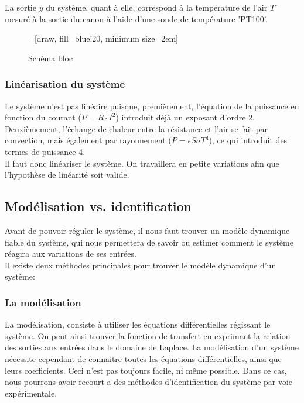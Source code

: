 La sortie $y$ du système, quant à elle, correspond à la température de l'air $T^\circ$
mesuré à la sortie du canon à l'aide d'une sonde de température 'PT100'.\\ 

\begin{figure}[H]	
    \centering
    =[draw, fill=blue!20, minimum size=2em]
    \caption{Schéma bloc}
\end{figure}


\subsubsection{Linéarisation du système}
Le système n'est pas linéaire puisque, premièrement, l'équation de la puissance en fonction
du courant ($P = R \cdot I^2$) introduit déjà un exposant d'ordre 2. 
Deuxièmement, l'échange de chaleur entre la résistance et l'air se fait par convection, 
mais également par rayonnement ($P = \epsilon S \sigma T^4$), ce qui introduit des termes
de puissance 4.\\

Il faut donc linéariser le système. On travaillera en petite variations afin que
l'hypothèse de linéarité soit valide.
 


\subsection{Modélisation vs. identification}
Avant de pouvoir réguler le système, il nous faut trouver un modèle dynamique fiable
du système, qui nous permettera de savoir ou estimer comment le système réagira aux
variations de ses entrées.\\

Il existe deux méthodes principales pour trouver le modèle dynamique d'un système: 
\subsubsection{La modélisation}
La modélisation, consiste à utiliser les équations différentielles régissant le système.
On peut ainsi trouver la fonction de transfert en exprimant la relation des sorties aux 
entrées dans le domaine de Laplace. La modélisation d'un système nécessite cependant de
connaitre toutes les équations différentielles, ainsi que leurs coefficients.
Ceci n'est pas toujours facile, ni même possible. Dans ce cas, nous pourrons avoir recourt
a des méthodes d'identification du système par voie expérimentale.

